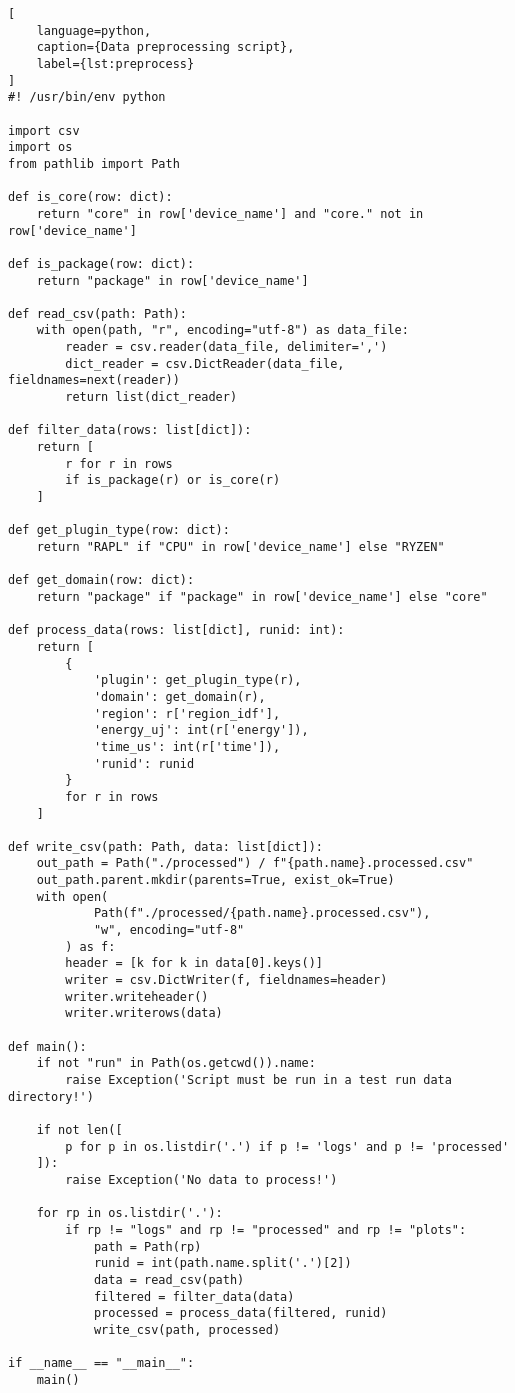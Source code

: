 \begin{lstlisting}[
    language=python,
    caption={Data preprocessing script},
    label={lst:preprocess}
]
#! /usr/bin/env python

import csv
import os
from pathlib import Path

def is_core(row: dict):
    return "core" in row['device_name'] and "core." not in row['device_name']

def is_package(row: dict):
    return "package" in row['device_name']

def read_csv(path: Path):
    with open(path, "r", encoding="utf-8") as data_file:
        reader = csv.reader(data_file, delimiter=',')
        dict_reader = csv.DictReader(data_file, fieldnames=next(reader))
        return list(dict_reader)

def filter_data(rows: list[dict]):
    return [
        r for r in rows
        if is_package(r) or is_core(r)
    ]

def get_plugin_type(row: dict):
    return "RAPL" if "CPU" in row['device_name'] else "RYZEN"

def get_domain(row: dict):
    return "package" if "package" in row['device_name'] else "core"

def process_data(rows: list[dict], runid: int):
    return [
        {
            'plugin': get_plugin_type(r),
            'domain': get_domain(r),
            'region': r['region_idf'],
            'energy_uj': int(r['energy']),
            'time_us': int(r['time']),
            'runid': runid
        }
        for r in rows
    ]

def write_csv(path: Path, data: list[dict]):
    out_path = Path("./processed") / f"{path.name}.processed.csv"
    out_path.parent.mkdir(parents=True, exist_ok=True)
    with open(
            Path(f"./processed/{path.name}.processed.csv"),
            "w", encoding="utf-8"
        ) as f:
        header = [k for k in data[0].keys()]
        writer = csv.DictWriter(f, fieldnames=header)
        writer.writeheader()
        writer.writerows(data)

def main():
    if not "run" in Path(os.getcwd()).name:
        raise Exception('Script must be run in a test run data directory!')

    if not len([
        p for p in os.listdir('.') if p != 'logs' and p != 'processed'
    ]):
        raise Exception('No data to process!')

    for rp in os.listdir('.'):
        if rp != "logs" and rp != "processed" and rp != "plots":
            path = Path(rp)
            runid = int(path.name.split('.')[2])
            data = read_csv(path)
            filtered = filter_data(data)
            processed = process_data(filtered, runid)
            write_csv(path, processed)

if __name__ == "__main__":
    main()
\end{lstlisting}
\clearpage
